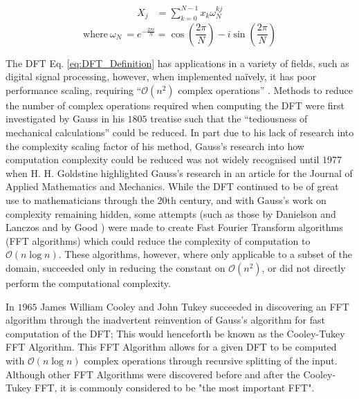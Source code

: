 \begin{align}
    X_j &= \sum_{k=0}^{N-1}x_k\omega_N^{kj}\label{eq:DFT_Definition}
\end{align}
\begin{equation}
    \text{where}~\omega_N~=e^{-\frac{2\pi i}{N}}
    = \cos{\left(\frac{2\pi}{N}\right)}-i\sin{\left(\frac{2\pi}{N}\right)}\label{eq:ComplexRootsOfUnity}
\end{equation}

The DFT Eq. \ref{eq:DFT_Definition} has applications in a variety of fields, such as digital signal processing\cite{Bellanger2024}, however, when implemented naïvely, it has poor performance scaling, requiring  
``$\mathcal{O}\left(n^2\right)$ complex operations'' \cite{VanLoan1992}.
Methods to reduce the number of complex operations required when computing the DFT were first investigated by Gauss in his $1805$ treatise such that the ``tediousness of mechanical calculations''\cite{Gauss1866} could be reduced.\cite{Heideman1985}
In part due to his lack of research into the complexity scaling factor of his method, Gauss's research into how computation complexity could be reduced was not widely recognised until $1977$ when H. H. Goldstine highlighted Gauss's research in an article for the Journal of Applied Mathematics and Mechanics.\cite{Heideman1985}\cite{Heinrich1980}
While the DFT continued to be of great use to mathematicians through the 20th century, and with Gauss's work on complexity remaining hidden, some attempts (such as those by Danielson and Lanczos \cite{Danielson1942} and by Good \cite{Good1958}) were made to create Fast Fourier Transform algorithms (FFT algorithms) which could reduce the complexity of computation to $\mathcal{O}\left(n\log n\right)$.
These algorithms, however, where only applicable to a subset of the domain\cite{Good1958}, succeeded only in reducing the constant on $\mathcal{O}\left(n^2\right)$, or did not directly perform the computational complexity\cite{Danielson1942}.

In $1965$ James William Cooley and John Tukey succeeded in discovering an FFT algorithm through the inadvertent reinvention of Gauss's algorithm for fast computation of the DFT; This would henceforth be known as the Cooley-Tukey FFT Algorithm.\cite{Cooley1965}\cite{Heideman1985}
This FFT Algorithm allows for a given DFT to be computed with $\mathcal{O}\left(n\log n\right)$ complex operations through recursive splitting of the input.\cite{Cooley1965}
Although other FFT Algorithms were discovered before and after the Cooley-Tukey FFT, it is commonly considered to be "the most important FFT"\cite{Frigo2005}.

